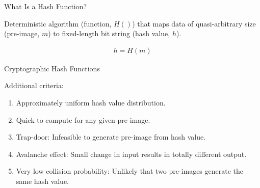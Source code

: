 \documentclass[handout]{beamer}
\begin{document}
\begin{frame}{What Is a Hash Function?}

Deterministic algorithm (\color{focus}function, $H()$\color{black}) that maps data of quasi-arbitrary size (\color{focus}pre-image, $m$\color{black}) to fixed-length bit string (\color{focus}hash value, $h$\color{black}).

	\begin{align}
		h = H(m)
		\label{eq:hash_function}
	\end{align}

\vspace{1.5em}
	
	
\end{frame}

\begin{frame}{Cryptographic Hash Functions}

Additional criteria:
	\begin{enumerate}
		\item Approximately uniform hash value distribution.
		\item Quick to compute for any given pre-image.
		\item Trap-door: Infeasible to generate pre-image from hash value.
		\item Avalanche effect: Small change in input results in totally different output.
		\item Very low collision probability: Unlikely that two pre-images generate the same hash value.
	\end{enumerate}
	\vspace{1em}

	
\end{frame}
\end{document}
